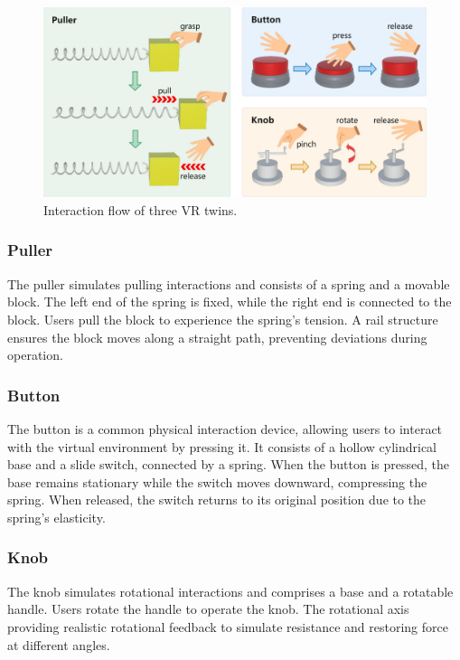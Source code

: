 \documentclass[runningheads]{llncs}
\begin{document}
\begin{figure}[t]
  \centering
  \includegraphics[width=1\textwidth]{image/Interaction-Flow.pdf}
  \caption{Interaction flow of three VR twins.}
  \label{fig:interaction-flow}
\end{figure}

\subsubsection{Puller}
The puller simulates pulling interactions and consists of a spring and a movable block. The left end of the spring is fixed, while the right end is connected to the block. Users pull the block to experience the spring's tension. A rail structure ensures the block moves along a straight path, preventing deviations during operation.

\subsubsection{Button}
The button is a common physical interaction device, allowing users to interact with the virtual environment by pressing it. It consists of a hollow cylindrical base and a slide switch, connected by a spring. When the button is pressed, the base remains stationary while the switch moves downward, compressing the spring. When released, the switch returns to its original position due to the spring's elasticity.

\subsubsection{Knob}
The knob simulates rotational interactions and comprises a base and a rotatable handle. Users rotate the handle to operate the knob. The rotational axis providing realistic rotational feedback to simulate resistance and restoring force at different angles.
\end{document}
